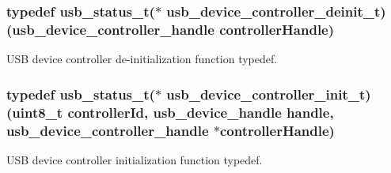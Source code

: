 \hypertarget{group__usb__device__controller__driver_ga283139f5df38421250c30a094f34088d}{
\subsubsection[{usb\-\_\-device\-\_\-controller\-\_\-deinit\-\_\-t}]{\setlength{\rightskip}{0pt plus 5cm}typedef {\bf usb\-\_\-status\-\_\-t}($\ast$ usb\-\_\-device\-\_\-controller\-\_\-deinit\-\_\-t)({\bf usb\-\_\-device\-\_\-controller\-\_\-handle} controller\-Handle)}}\label{group__usb__device__controller__driver_ga283139f5df38421250c30a094f34088d}


U\-S\-B device controller de-\/initialization function typedef. 

\hypertarget{group__usb__device__controller__driver_ga7f8af48e2f4f886f521f8128b6a05e9b}{
\subsubsection[{usb\-\_\-device\-\_\-controller\-\_\-init\-\_\-t}]{\setlength{\rightskip}{0pt plus 5cm}typedef {\bf usb\-\_\-status\-\_\-t}($\ast$ usb\-\_\-device\-\_\-controller\-\_\-init\-\_\-t)(uint8\-\_\-t controller\-Id, {\bf usb\-\_\-device\-\_\-handle} handle, {\bf usb\-\_\-device\-\_\-controller\-\_\-handle} $\ast$controller\-Handle)}}\label{group__usb__device__controller__driver_ga7f8af48e2f4f886f521f8128b6a05e9b}


U\-S\-B device controller initialization function typedef. 

